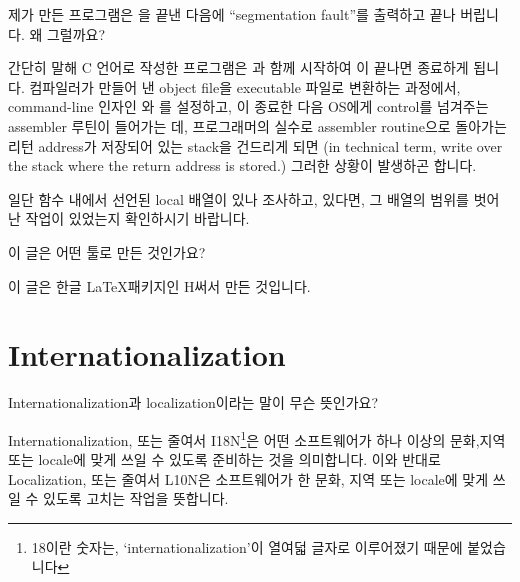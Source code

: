 \begin{faq}	\label{faq:segfault-after-main}
	제가 만든 프로그램은 을 끝낸 다음에 
	``segmentation fault''를 출력하고 끝나 버립니다. 왜 그럴까요?

\A
	간단히 말해 C 언어로 작성한 프로그램은 과 함께 시작하여
	이 끝나면 종료하게 됩니다.  컴파일러가 만들어 낸
	object file을 executable 파일로 변환하는 과정에서,
	command-line 인자인 와 를 설정하고,
	이 종료한 다음 OS에게 control를 넘겨주는 assembler
	루틴이 들어가는 데,  프로그래머의 실수로 assembler routine으로
	돌아가는 리턴 address가 저장되어 있는 stack을 건드리게 되면
	(in technical term, write over the stack where the return
	address is stored.) 그러한 상황이 발생하곤 합니다.

	일단  함수 내에서 선언된 local 배열이 있나 조사하고,
	있다면, 그 배열의 범위를 벗어난 작업이 있었는지 확인하시기
	바랍니다.
\end{faq}


\begin{faq}
	이 글은 어떤 툴로 만든 것인가요?

\A
	이 글은  한글 \LaTeX 패키지인 H 써서 만든 것입니다.
\end{faq}

\section{Internationalization}

\begin{faq}
	Internationalization과 localization이라는 말이 무슨 뜻인가요?

\A
	Internationalization, 또는 줄여서 I18N\footnote{18이란 숫자는,
          `internationalization'이 열여덟 글자로 이루어졌기 때문에
          붙었습니다}은 어떤 소프트웨어가 하나 이상의 문화,지역 또는 locale에
        맞게 쓰일 수 있도록 준비하는 것을 의미합니다.
        이와 반대로 Localization, 또는 줄여서 L10N은 
        소프트웨어가 한 문화, 지역 또는 locale에 맞게 쓰일 수 있도록 
        고치는 작업을 뜻합니다.
        
\R
	\cite{cjkv} 
\end{faq}

